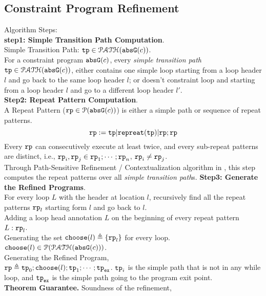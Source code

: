 \subsection{Constraint Program Refinement}
\label{sec:refine}
Algorithm Steps:
\\
\textbf{step1: Simple Transition Path Computation}.
\\
% 
Simple Transition Path: ${\mathtt{tp}} \in \mathcal{PATH}({\mathtt{abs}}{{\mathtt{G}}}(c))$.
\\
For a constraint program ${\mathtt{abs}}{{\mathtt{G}}}(c)$,
every \emph{simple transition path} ${\mathtt{tp}} \in \mathcal{PATH}({\mathtt{abs}}{{\mathtt{G}}}(c))$,
either contains one simple loop starting from a loop header $l$ and go back to the same loop header $l$;
or doesn't constraint loop and starting from a loop header $l$ and go to a different loop header $l'$.
\\
\textbf{Step2: Repeat Pattern Computation}.
\\
A Repeat Pattern (${\mathtt{rp}} \in \mathcal{P}({{\mathtt{abs}}{{\mathtt{G}}}(c)})$) is either a simple path or sequence of repeat patterns. 
\[
  {\mathtt{rp}} := {\mathtt{tp}} | {\mathtt{repreat}}({\mathtt{tp}}) | {\mathtt{rp}}; {\mathtt{rp}}
\]
Every ${\mathtt{rp}}$ can consecutively execute at least twice, and
 every sub-repeat patterns are distinct, i.e.,
 ${\mathtt{rp}}_i, {\mathtt{rp}}_j \in {\mathtt{rp}}_1; \cdots; {\mathtt{rp}}_n$, ${\mathtt{rp}}_i \neq {\mathtt{rp}}_j$.
 \\
Through Path-Sensitive Refinement / Contextualization algorithm in \cite{GulwaniJK09, ZulegerGSV11},
this step computes the repeat patterns over all \emph{simple transition path}s.
\textbf{Step3: Generate the Refined Programs}.
\\
For every loop $L$ with the header at location $l$,
recursively 
find all the repeat patterns ${\mathtt{rp}}_l$ starting form $l$ and go back to $l$.
\\
Adding a loop head annotation $L$ on the beginning of every repeat pattern $L: {\mathtt{rp}}_l$.
\\
Generating the set ${\mathtt{choose}}(l) \triangleq \{ {\mathtt{rp}}_l \} $
for every loop. ${\mathtt{choose}}(l) \in \mathcal{P}(\mathcal{PATH}({\mathtt{abs}}{{\mathtt{G}}}(c)))$.
\\
Generating the Refined Program,
\\
%
${\mathtt{rp}} \triangleq {\mathtt{tp}}_0; {\mathtt{choose}}(l) ; {\mathtt{tp}}_1; \cdots; {\mathtt{tp}}_{{\mathtt{ex}}}$.
%
${\mathtt{tp}}_i$ is the simple path that is not in any while loop,
and ${\mathtt{tp}}_{{\mathtt{ex}}}$ is the simple path going to the program exit point.
\\
\textbf{Theorem Guarantee.}
Soundness of the refinement,
